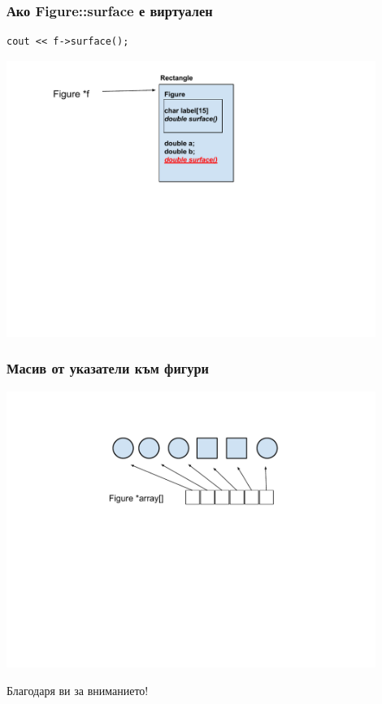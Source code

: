 \documentclass{beamer}
\begin{document}
\begin{frame}[fragile]
\frametitle{Ако Figure::surface е виртуален}


\begin{flushleft}
\begin{lstlisting}
cout << f->surface();
\end{lstlisting}
\end{flushleft}

\begin{center}
\includegraphics[width=12.0cm]{images/inmen_rect_withptr_r2}
\end{center}


\end{frame}


\begin{frame}[fragile]
\frametitle{Масив от указатели към фигури}

\begin{center}
\includegraphics[width=12.0cm]{images/array}
\end{center}


\end{frame}


\begin{frame}
\centerline{Благодаря ви за вниманието!}
\end{frame}
\end{document}
